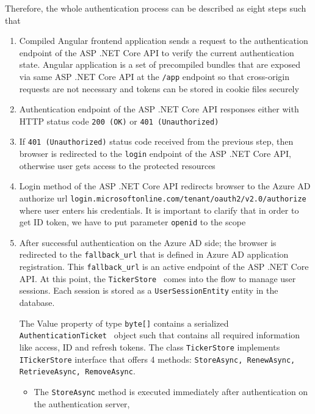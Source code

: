 Therefore, the whole authentication process can be described as eight steps such that
\begin{enumerate}
    \item Compiled Angular frontend application sends a request to the authentication endpoint of the ASP .NET Core API
    to verify the current authentication state.
    Angular application is a set of precompiled bundles that are exposed via same ASP .NET Core API at the \texttt{/app}
    endpoint so that cross-origin requests are not necessary and tokens can be stored in cookie files securely
    \item Authentication endpoint of the ASP .NET Core API responses either with
    HTTP status code \texttt{200 (OK)} or \texttt{401 (Unauthorized)}
    \item If \texttt{401 (Unauthorized)} status code received from the previous step,
    then browser is redirected to the \texttt{login} endpoint of the ASP .NET Core API,
    otherwise user gets access to the protected resources
    \item Login method of the ASP .NET Core API redirects browser to the Azure AD authorize url
    \texttt{login.microsoftonline.com/tenant/oauth2/v2.0/authorize} where user enters his credentials.
    It is important to clarify that in order to get ID token, we have to put parameter \texttt{openid} to the scope
    
    \item After successful authentication on the Azure AD side; the browser is redirected to the \texttt{fallback\_url}
    that is defined in Azure AD application registration.
    This \texttt{fallback\_url} is an active endpoint of the ASP .NET Core API\@.
    At this point, the \texttt{TickerStore}~\cite{microsoftIticketstore2023, ticketStore_2023}
    comes into the flow to manage user sessions.
    Each session is stored as a \texttt{UserSessionEntity} entity in the database.
    
    The Value property of type \texttt{byte[]} contains a serialized \texttt{AuthenticationTicket}~\cite{microsoftAuthenticationTicket2023}
    object such that contains all required information like access, ID and refresh tokens.
    The class \texttt{TickerStore} implements \texttt{ITickerStore} interface that offers 4 methods:
    \texttt{StoreAsync, RenewAsync, RetrieveAsync, RemoveAsync}.
    \begin{itemize}
        \item The \texttt{StoreAsync} method is executed immediately after authentication on the authentication server,

\end{itemize}
\end{enumerate}

